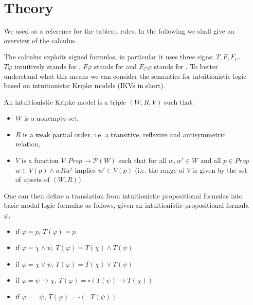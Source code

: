 
\section{Theory}

We used \cite{main} as a reference for the tableau rules. In the following we shall give an overview of the calculus. 

The calculus exploits signed formulas, in particular it uses three signs: $T,F,F_C$. $T \varphi$ intuitively stands for , $F \varphi$ stands for  and $F_C \varphi$ stands for .
To better understand what this means we can consider the semantics for intuitionistic logic based on intuitionistic Kripke models (IKVs in short).
\begin{definition}
    An intuitionistic Kripke model is a triple $(W,R,V)$ such that:
    \begin{itemize}
        \item $W$ is a nonempty set,
        \item $R$ is a weak partial order, i.e. a transitive, reflexive and antisymmetric relation,
        \item $V$ is a function $V : Prop \rightarrow \mathcal{P}(W)$ such that for all $w,w' \in W$ and all $p \in Prop$ $w \in V(p) \land wRw'$ implies $w' \in V(p)$ (i.e. the range of $V$ is given by the set of upsets of $(W,R)$).
    \end{itemize}
\end{definition}

One can then define a translation from intuitionistic propositional formulas into basic modal logic formulas as follows, given an intuitionistic propositional formula $\varphi$,
\begin{itemize}
    \item if $\varphi=p$, $T(\varphi)=p$
    \item if $\varphi= \chi \land \psi$, $T(\varphi)= T(\chi) \land T(\psi)$
    \item if $\varphi= \chi \lor \psi$, $T(\varphi)= T(\chi) \lor T(\psi)$
    \item if $\varphi=\psi \rightarrow \chi$, $T(\varphi)=\square (T(\psi) \rightarrow T(\chi))$
    \item if $\varphi= \neg \psi$, $T(\varphi)= \square (\neg T(\psi))$
\end{itemize}

